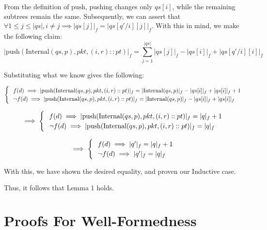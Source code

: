 \documentclass{article}
\begin{document}
From the definition of $\text{push}$, pushing changes only $qs[i]$, while the remaining subtrees remain the same. Subsequently, we can assert that $\forall 
1 \leq j \leq |qs|, i \neq j \implies |qs[j]|_f = |qs[q'/i][j]|_f$. With this in mind, we make the following claim:\\[-15pt]

$$|\text{push}(\text{Internal}(qs, p), pkt, (i, r) :: pt)|_f = \sum_{j=1}^{|qs|} |qs[j]|_f - |qs[i]|_f + |qs[q'/i][i]|_f$$

Substituting what we know gives the following:

$$\begin{cases}
    \hspace{0.25cm} f(d) \implies |\text{push}(\text{Internal}(qs, p), pkt, (i, r) :: pt)|_f = |\text{Internal}(qs, p)|_f - |qs[i]|_f + |qs[i]|_f + 1\\
    \hspace{0.25cm} \neg f(d) \implies |\text{push}(\text{Internal}(qs, p), pkt, (i, r) :: pt)|_f = |\text{Internal}(qs, p)|_f - |qs[i]|_f + |qs[i]|_f\\
\end{cases}$$

$$\implies \begin{cases}
    \hspace{0.25cm} f(d) \implies |\text{push}(\text{Internal}(qs, p), pkt, (i, r) :: pt)|_f = |q|_f + 1\\
    \hspace{0.25cm} \neg f(d) \implies |\text{push}(\text{Internal}(qs, p), pkt, (i, r) :: pt)|_f = |q|_f \\
\end{cases}$$

$$\implies \begin{cases}
    \hspace{0.25cm} f(d) \implies |q'|_f = |q|_f + 1\\
    \hspace{0.25cm} \neg f(d) \implies|q'|_f = |q|_f \\
\end{cases}$$

With this, we have shown the desired equality, and proven our Inductive case.\newline

Thus, it follows that Lemma 1 holds.\newline

\newpage

\section{Proofs For Well-Formedness}
\end{document}
